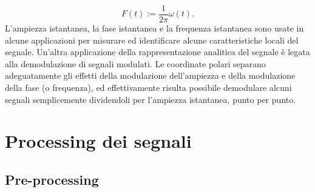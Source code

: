 \documentclass[12pt,a4paper, twoside, openright]{report}
\begin{document}
\begin{equation}
	F(t):= \frac{1}{2 \pi} \omega (t).
\end{equation}
L’ampiezza istantanea, la fase istantanea e la frequenza istantanea sono usate in alcune applicazioni per misurare ed identificare alcune caratteristiche locali del segnale.
Un’altra applicazione della rappresentazione analitica del segnale è legata alla demodulazione di segnali modulati.
Le coordinate polari separano adeguatamente gli effetti della modulazione dell’ampiezza e della modulazione della fase (o frequenza), ed effettivamente risulta possibile demodulare alcuni segnali semplicemente dividendoli per l'ampiezza istantanea, punto per punto.
 


\section{Processing dei segnali}


\subsection{Pre-processing}
\end{document}

